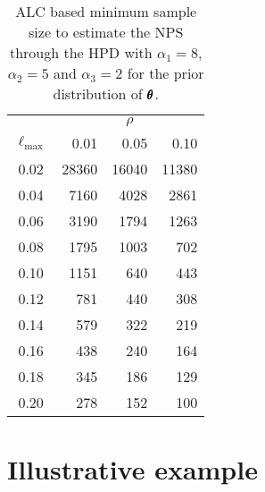 \documentclass[12pt,a4paper]{article}%
\newcommand*{\bff}[1]{\ifmmode\pmb{#1}\else\textbf{#1}\fi}
\begin{document}
\begin{table}
\begin{center}
\caption{ALC based minimum sample size to estimate the NPS through the HPD with $\alpha_1=8$, $\alpha_2=5$ and $\alpha_3=2$ for the prior distribution of $\bff{\theta}$.}\label{min-n-cen4}
\begin{tabular}{crrr}
\hline
 & \multicolumn{3}{c}{$\rho$} \\\cline{2-4}
$\ell_{\text{max}}$ & 0.01 & 0.05 & 0.10\\\hline
0.02 & 28360 & 16040 & 11380\\
0.04 & 7160  & 4028  & 2861 \\
0.06 & 3190  & 1794  & 1263 \\
0.08 & 1795  & 1003  & 702  \\
0.10 & 1151  & 640   & 443  \\
0.12 & 781   & 440   & 308  \\
0.14 & 579   & 322   & 219  \\
0.16 & 438   & 240   & 164  \\
0.18 & 345   & 186   & 129  \\
0.20 & 278   & 152   & 100\\
\hline
\end{tabular}
\end{center}
\end{table}





% 
% 
% 
% 
% 

\section{Illustrative example}\label{sec-example}
\end{document}
